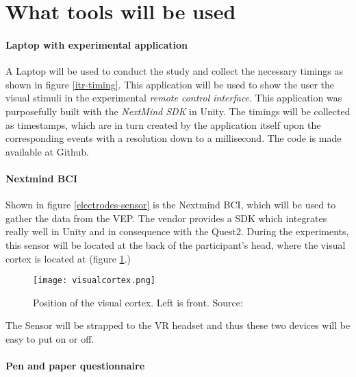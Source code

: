         \section{What tools will be used}

            \paragraph{Laptop with experimental application}

                A Laptop will be used to conduct the study and collect the necessary timings as shown in figure \ref*{itr-timing}. This application will be used to show the user the visual stimuli in the experimental \textit{remote control interface}. This application was purposefully built with the \textit{NextMind SDK} in Unity. The timings will be collected as timestamps, which are in turn created by the application itself upon the corresponding events with a resolution down to a millisecond. The code is made available at Github\cite[]{GitHub.04102021}.

            \paragraph{Nextmind BCI}                

                Shown in figure \ref*{electrodes-sensor} is the Nextmind BCI, which will be used to gather the data from the VEP. The vendor provides a SDK which integrates really well in Unity and in consequence with the Quest2. During the experiments, this sensor will be located at the back of the participant's head, where the visual cortex is located at (figure \ref*{visual-cortex}.)

                \begin{figure}[h]     %
                    \centering
                    \texttt{[image: visualcortex.png]} 
                    \caption{Position of the visual cortex. Left is front. Source: \cite{Dr.KenBrodaBahm.2013}}\label{visual-cortex}
                \end{figure}

                The Sensor will be strapped to the VR headset and thus these two devices will be easy to put on or off.

            \paragraph{Pen and paper questionnaire}

